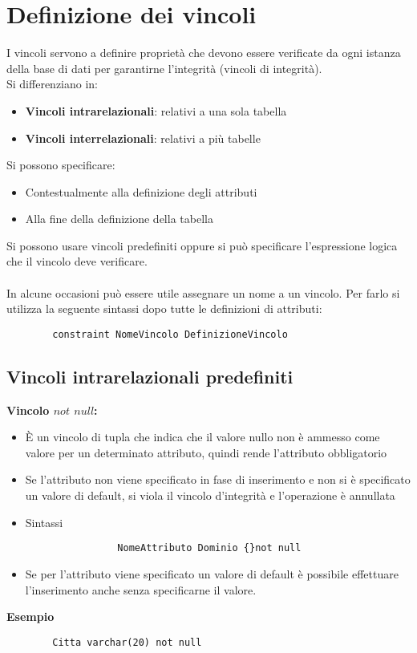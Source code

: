 \section{Definizione dei vincoli}
I vincoli servono a definire proprietà che devono essere verificate da ogni istanza della base di dati per garantirne l'integrità (vincoli di integrità).\\
Si differenziano in:
    \begin{itemize}
        \item{\textbf{Vincoli intrarelazionali}: relativi a una sola tabella}
        \item{\textbf{Vincoli interrelazionali}: relativi a più tabelle}
    \end{itemize}
Si possono specificare:
    \begin{itemize}
        \item{Contestualmente alla definizione degli attributi}
        \item{Alla fine della definizione della tabella}
    \end{itemize}
Si possono usare vincoli predefiniti oppure si può specificare l'espressione logica che il vincolo deve verificare.\\\\
In alcune occasioni può essere utile assegnare un nome a un vincolo. Per farlo si utilizza la seguente sintassi dopo tutte le definizioni di attributi:
    \begin{lstlisting}
        constraint NomeVincolo DefinizioneVincolo
    \end{lstlisting}

\subsection{Vincoli intrarelazionali predefiniti}
\textbf{Vincolo $not$ $null$:}
    \begin{itemize}
        \item{È un vincolo di tupla che indica che il valore nullo non è ammesso come valore per un determinato attributo, quindi rende l'attributo obbligatorio}
        \item{Se l'attributo non viene specificato in fase di inserimento e non si è specificato un valore di default, si viola il vincolo d'integrità e l'operazione è annullata}
        \item{Sintassi
            \begin{lstlisting}
                NomeAttributo Dominio {}not null
            \end{lstlisting}}
        \item{Se per l'attributo viene specificato un valore di default è possibile effettuare l'inserimento anche senza specificarne il valore.}
    \end{itemize}
\textbf{Esempio}
    \begin{lstlisting}
        Citta varchar(20) not null
    \end{lstlisting}
    
